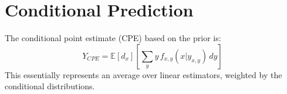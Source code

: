 \documentclass[a4paper, 11pt]{article}
\begin{document}
\section{Conditional Prediction}

The conditional point estimate (CPE) based on the prior is:
\begin{equation}
Y_{CPE} = \mathbb{E} [ d_x ] \left[ \sum_{y} y \, f_{x,y}(x | y_{x,y}) \, dy \right]
\end{equation}
This essentially represents an average over linear estimators, weighted by the conditional distributions.
\end{document}
